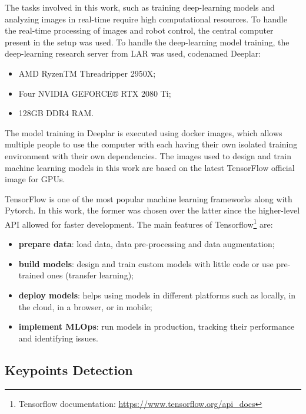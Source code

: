 The tasks involved in this work, such as training deep-learning models and analyzing images in real-time require high computational resources. To handle the real-time processing of images and robot control, the central computer present in the setup was used. To handle the deep-learning model training, the deep-learning research server from LAR was used, codenamed Deeplar:
\begin{itemize}
    \item AMD RyzenTM Threadripper 2950X;
    \item Four NVIDIA GEFORCE® RTX 2080 Ti;
    \item 128GB DDR4 RAM.
\end{itemize}

The model training in Deeplar is executed using docker images, which allows multiple people to use the computer with each having their own isolated training environment with their own dependencies. The images used to design and train machine learning models in this work are based on the latest TensorFlow official image for GPUs.

TensorFlow is one of the most popular machine learning frameworks along with Pytorch. In this work, the former was chosen over the latter since the higher-level API allowed for faster development. The main features of Tensorflow\footnote{Tensorflow documentation: \url{https://www.tensorflow.org/api_docs}} are:
\begin{itemize}
    \item \textbf{prepare data}: load data, data pre-processing and data augmentation;
    \item \textbf{build models}: design and train custom models with little code or use pre-trained ones (transfer learning);
    \item \textbf{deploy models}: helps using models in different platforms such as locally, in the cloud, in a browser, or in mobile;
    \item \textbf{implement MLOps}: run models in production, tracking their performance and identifying issues.
\end{itemize}

\subsection{Keypoints Detection}
\label{subsection:keypointdetection}

